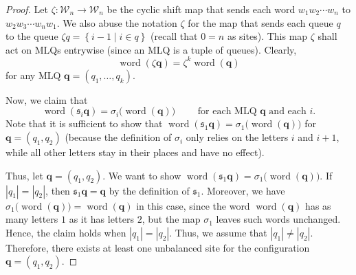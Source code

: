 \documentclass[reqno]{amsart}
\newcommand{\0}{\phantom{c}}
\newcommand{\qq}{\mathbf{q}}
\newcommand{\mcW}{\mathcal{W}}
\newcommand{\fraks}{\mathfrak{s}}
\newcommand{\word}{\operatorname{word}}
\newcommand{\set}[1]{\left\{ #1 \right\}}
\newcommand{\abs}[1]{\left| #1 \right|}
\theoremstyle{plain}
\theoremstyle{definition}
\numberwithin{equation}{section}
\begin{document}
\begin{proof}
Let $\zeta \colon \mcW_n \to \mcW_n$ be the cyclic shift map that sends each word $w_1 w_2 \cdots w_n$ to $w_2 w_3 \cdots w_n w_1$.
We also abuse the notation $\zeta$ for the map that sends each queue $q$ to the queue $\zeta q = \set{ i - 1 \mid i \in q }$ (recall that $0 = n$ as sites).
This map $\zeta$ shall act on MLQs entrywise (since an MLQ is a tuple of queues).
Clearly,
\begin{equation}
 \word(\zeta \qq) = \zeta^k \word(\qq)
 \label{pf.prop:braid.word-zeta}
\end{equation}
for any MLQ $\qq = (q_1, \ldots, q_k)$.

Now, we claim that
\begin{equation}
 \word(\fraks_i \qq) = \sigma_i\bigl( \word(\qq) \bigr)
 \qquad \text{ for each MLQ } \qq \text{ and each } i .
 \label{pf.prop:braid.inter}
\end{equation}
Note that it is sufficient to show that $\word(\fraks_1 \qq) = \sigma_1\bigl( \word(\qq) \bigr)$ for $\qq = (q_1, q_2)$
(because the definition of $\sigma_i$ only relies on the letters $i$ and $i+1$, while all other letters stay in their places and have no effect).

Thus, let $\qq = (q_1, q_2)$.
We want to show $\word(\fraks_1 \qq) = \sigma_1\bigl( \word(\qq) \bigr)$.
If $\abs{q_1} = \abs{q_2}$, then $\fraks_1 \qq = \qq$ by the definition of $\fraks_1$.
Moreover, we have $\sigma_1\bigl( \word(\qq) \bigr) = \word(\qq)$ in this case, since the word $\word(\qq)$ has as many letters $1$ as it has letters $2$, but the map $\sigma_1$ leaves such words unchanged.
Hence, the claim holds when $\abs{q_1} = \abs{q_2}$.
Thus, we assume that $\abs{q_1} \neq \abs{q_2}$.
Therefore, there exists at least one unbalanced site for the configuration $\qq = (q_1, q_2)$.


\end{proof}
\end{document}
